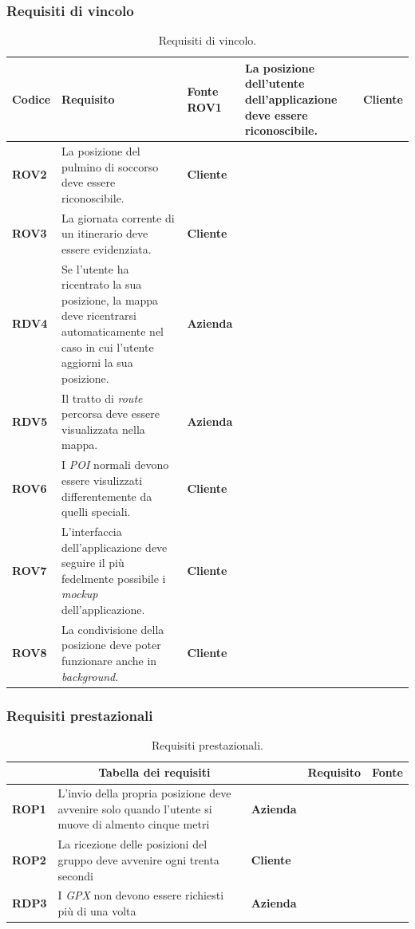 \subsubsection{Requisiti di vincolo}
\begin{longtable}{ |p{2cm}|p{8cm}|p{2cm}|  }
    \caption{Requisiti di vincolo.}
    \label{tab:req-vincolo}
    \hline
    \textbf{Codice} & \textbf{Requisito} & \textbf{Fonte}
    \hline
    \textbf{ROV1} & La posizione dell'utente dell'applicazione deve essere riconoscibile. & \textbf{Cliente} \\ \hline
    \textbf{ROV2} & La posizione del pulmino di soccorso deve essere riconoscibile. & \textbf{Cliente} \\ \hline
    \textbf{ROV3} & La giornata corrente di un itinerario deve essere evidenziata. & \textbf{Cliente} \\ \hline
    \textbf{RDV4} & Se l'utente ha ricentrato la sua posizione, la mappa deve ricentrarsi automaticamente nel caso in cui l'utente aggiorni la sua posizione. & \textbf{Azienda} \\ \hline
    \textbf{RDV5} & Il tratto di \textit{route} percorsa deve essere visualizzata nella mappa. & \textbf{Azienda} \\ \hline
    \textbf{ROV6} & I \textit{POI} normali devono essere visulizzati differentemente da quelli speciali. & \textbf{Cliente} \\ \hline
    \textbf{ROV7} & L'interfaccia dell'applicazione deve seguire il più fedelmente possibile i \textit{mockup} dell'applicazione. & \textbf{Cliente} \\ \hline
    \textbf{ROV8} & La condivisione della posizione deve poter funzionare anche in \textit{background}. & \textbf{Cliente}\\ \hline
\end{longtable}

\subsubsection{Requisiti prestazionali}
\begin{longtable}{ |p{2cm}|p{8cm}|p{2cm}|  }
    \caption{Requisiti prestazionali.}
    \label{tab:req-prestazioni}
    \hline
    \multicolumn{3}{|c|}{Tabella dei requisiti}
    \hline
    \textbf{Codice} & \textbf{Requisito} & \textbf{Fonte} \\ \hline
    \textbf{ROP1} & L'invio della propria posizione deve avvenire solo quando l'utente si muove di almento cinque metri & \textbf{Azienda} \\ \hline
    \textbf{ROP2} & La ricezione delle posizioni del gruppo deve avvenire ogni trenta secondi & \textbf{Cliente} \\ \hline
    \textbf{RDP3} & I \textit{GPX} non devono essere richiesti più di una volta & \textbf{Azienda} \\ \hline
\end{longtable} 


